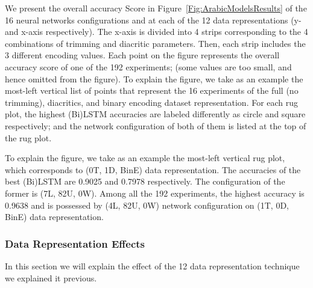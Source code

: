We present the overall accuracy Score in Figure~\ref{Fig:ArabicModelsResults} of the 16 neural networks configurations and at each of the 12 data representations (y- and x-axis respectively). The x-axis is divided into 4 strips corresponding to the 4 combinations of trimming and diacritic parameters. Then, each strip includes the 3 different encoding values. Each point on the figure represents the overall accuracy score of one of the 192 experiments; (some values are too small, and hence omitted from the figure). To explain the figure, we take as an example the most-left vertical list of points that represent the 16 experiments of the full (no trimming), diacritics, and binary encoding dataset representation. For each rug plot, the highest (Bi)LSTM accuracies are labeled differently as circle and square respectively; and the network configuration of both of them is listed at the top of the rug plot.

To explain the figure, we take as an example the most-left vertical rug plot, which corresponds to (0T, 1D, BinE) data representation. The accuracies of the best (Bi)LSTM are 0.9025 and 0.7978 respectively. The configuration of the former is (7L, 82U, 0W). Among all the 192 experiments, the highest accuracy is 0.9638 and is possessed by (4L, 82U, 0W) network configuration on (1T, 0D, BinE) data representation.



\subsubsection{Data Representation Effects}

In this section we will explain the effect of the 12 data representation technique we explained it previous.

